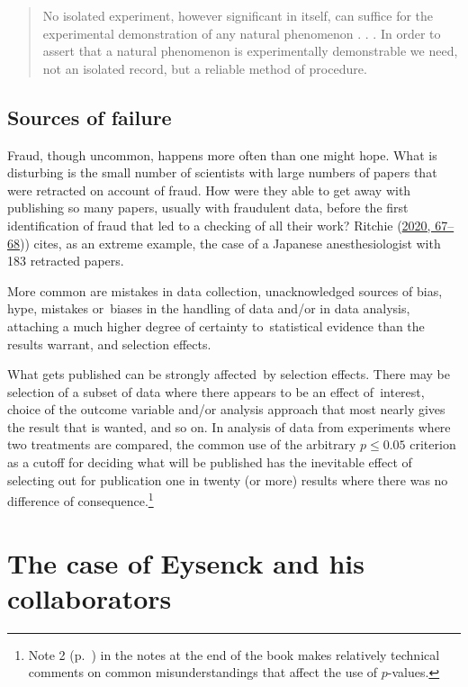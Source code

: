 \documentclass[
  10pt,
  b5paper]{book}
\begin{document}
\begin{quote}
No isolated experiment, however significant in itself, can suffice for the experimental demonstration of any natural phenomenon . . . In order to assert that a natural phenomenon is experimentally demonstrable we need, not an isolated record, but a reliable method of procedure.
\end{quote}

\hypertarget{sources-of-failure}{%
\subsection*{Sources of failure}\label{sources-of-failure}}

Fraud, though uncommon, happens more often than one might hope.
What is disturbing is the small number of scientists with
large numbers of papers that were retracted on account of
fraud. How were they able to get away with publishing so
many papers, usually with fraudulent data, before the
first identification of fraud that led to a checking of all
their work? Ritchie (\protect\hyperlink{ref-ritchie2020science}{2020, 67--68})) cites,
as an extreme example, the case of a Japanese anesthesiologist
with 183 retracted papers.

More common are mistakes in data collection, unacknowledged
sources of bias, hype, mistakes or~biases in the handling of
data and/or in data analysis, attaching a much higher
degree of certainty to~statistical evidence than the results
warrant, and selection effects.

What gets published can be strongly affected~by selection
effects. There may be selection of a subset of data where
there appears to be an effect of~interest, choice of the
outcome variable and/or analysis approach that most nearly
gives the result that is wanted, and so on. In analysis of
data from experiments where two treatments are compared,
the common use of the arbitrary \(p \leq 0.05\)
criterion as a cutoff for deciding what will be published
has the inevitable effect of selecting out for publication
one in twenty (or more) results where there was no difference
of consequence.\footnote{Note 2 (p.~\pageref{pval}) in the notes at the end of the book makes relatively technical comments on common misunderstandings that affect the use of \(p\)-values.}

\hypertarget{the-case-of-eysenck-and-his-collaborators}{%
\section{The case of Eysenck and his collaborators}\label{the-case-of-eysenck-and-his-collaborators}}
\end{document}

